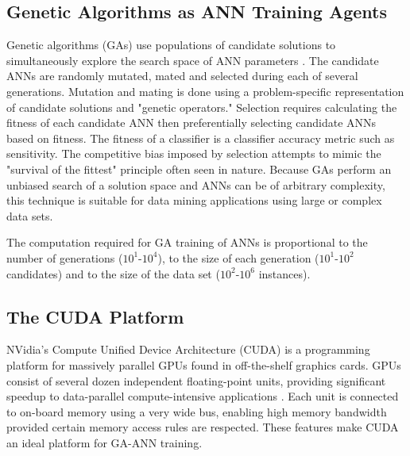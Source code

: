 \documentclass[11pt]{article}       %
\begin{document}
\subsection{Genetic Algorithms as ANN Training Agents} \label{ga}
Genetic algorithms (GAs) use populations of candidate solutions to simultaneously explore the search space of ANN parameters \cite{GA-ANN}. The candidate ANNs are randomly mutated, mated and selected during each of several generations. Mutation and mating is done using a problem-specific representation of candidate solutions and "genetic operators." Selection requires calculating the fitness of each candidate ANN  then preferentially selecting candidate ANNs based on fitness. The fitness of a classifier is a classifier accuracy metric such as sensitivity.  The competitive bias imposed by selection attempts to mimic the "survival of the fittest" principle often seen in nature.  Because GAs perform an unbiased search of a solution space and ANNs can be of arbitrary complexity, this technique is suitable for data mining applications using large or complex data sets.

The computation required for GA training of ANNs is proportional to the number of generations ($10^1$-$10^4$), to the size of each generation ($10^1$-$10^2$ candidates) and to the size of the data set ($10^2$-$10^6$ instances).

\subsection{The CUDA Platform} \label{cuda}
NVidia's Compute Unified Device Architecture (CUDA) is a programming platform for massively parallel GPUs found in off-the-shelf graphics cards. GPUs consist of several dozen independent floating-point units, providing significant speedup to data-parallel compute-intensive applications \cite{cuda}. Each unit is connected to on-board memory using a very wide bus, enabling high memory bandwidth provided certain memory access rules are respected. These features make CUDA an ideal platform for GA-ANN training.

\end{document}
